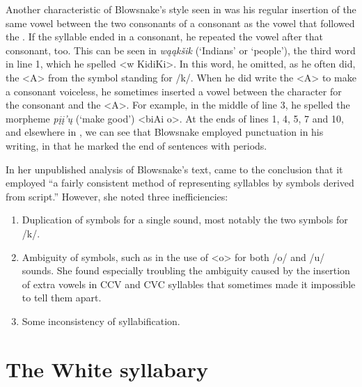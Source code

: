 \documentclass[output=paper]{LSP/langsci}
\begin{document}
Another characteristic of Blowsnake's  style seen in  was his regular insertion of the same vowel between the two consonants of a consonant  as the vowel that followed the . If the syllable ended in a consonant, he repeated the vowel after that consonant, too. This can be seen in \emph{w\k{a}\k{a}k\v{s}ik} (`Indians' or `people'), the third word in line 1, which he spelled <w KidiKi>. In this word, he omitted, as he often did, the <A> from the symbol standing for /k/. When he did write the <A> to make a consonant voiceless, he sometimes inserted a vowel between the character for the consonant and the <A>. For example, in the middle of line 3, he spelled the morpheme \emph{p\k{i}\k{i}'\k{u}} (`make good') <biAi o>. At the ends of lines 1, 4, 5, 7 and 10, and elsewhere in , we can see that Blowsnake employed punctuation in his writing, in that he marked the end of sentences with periods.

In her unpublished analysis of Blowsnake's  text, \citeauthor{Susman1939} came to the conclusion that it employed ``a fairly consistent method of representing syllables by symbols derived from  script.'' However, she noted three inefficiencies: 


\begin{enumerate}
\item{Duplication of symbols for a single sound, most notably the two symbols for /k/.}
\item{Ambiguity of symbols, such as in the use of <o> for both /o/ and /u/ sounds. She found especially troubling the ambiguity caused by the insertion of extra vowels in CCV and CVC syllables that sometimes made it impossible to tell them apart.}
\item{Some inconsistency of syllabification.}
\end{enumerate}

\section{The White syllabary}
\end{document}
